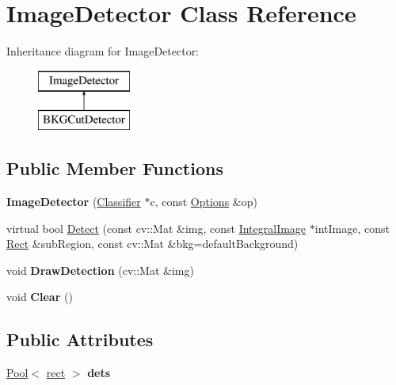\hypertarget{classImageDetector}{}\section{Image\+Detector Class Reference}
\label{classImageDetector}
Inheritance diagram for Image\+Detector\+:\begin{figure}[H]
\begin{center}
\leavevmode
\includegraphics[height=2.000000cm]{classImageDetector}
\end{center}
\end{figure}
\subsection*{Public Member Functions}
\begin{DoxyCompactItemize}
\item 
\hypertarget{classImageDetector_a46465717138658c7f29146d4aa057d98}{}{\bfseries Image\+Detector} (\hyperlink{classClassifier}{Classifier} $\ast$c, const \hyperlink{structOptions}{Options} \&op)\label{classImageDetector_a46465717138658c7f29146d4aa057d98}

\item 
virtual bool \hyperlink{classImageDetector_ae04e532f1de2cb8da3b514b7585ef624}{Detect} (const cv\+::\+Mat \&img, const \hyperlink{classIntegralImage}{Integral\+Image} $\ast$int\+Image, const \hyperlink{classRect}{Rect} \&sub\+Region, const cv\+::\+Mat \&bkg=default\+Background)
\item 
\hypertarget{classImageDetector_a866cc9f2e6b109ea8a897e96c4b106a1}{}void {\bfseries Draw\+Detection} (cv\+::\+Mat \&img)\label{classImageDetector_a866cc9f2e6b109ea8a897e96c4b106a1}

\item 
\hypertarget{classImageDetector_a2293f8558975b3404dae1ed077d47580}{}void {\bfseries Clear} ()\label{classImageDetector_a2293f8558975b3404dae1ed077d47580}

\end{DoxyCompactItemize}
\subsection*{Public Attributes}
\begin{DoxyCompactItemize}
\item 
\hypertarget{classImageDetector_a38b4eb45a8506399546219cc17886f7c}{}\hyperlink{classPool}{Pool}$<$ \hyperlink{structrect}{rect} $>$ {\bfseries dets}\label{classImageDetector_a38b4eb45a8506399546219cc17886f7c}

\end{DoxyCompactItemize}
